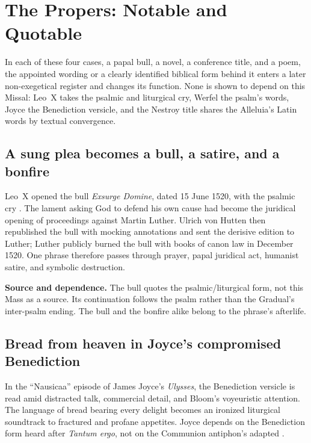 \sectionguard
\section*{The Propers: Notable and Quotable}

\begin{studyframe}
In each of these four cases, a papal bull, a novel, a conference title, and
a poem, the appointed wording or a clearly identified biblical form behind it
enters a later non-exegetical register and changes its function. None is shown
to depend on this Missal: Leo~X takes the psalmic and liturgical cry, Werfel
the psalm's words, Joyce the Benediction versicle, and the Nestroy title
shares the Alleluia's Latin words by textual convergence.
\end{studyframe}

\subsection*{A sung plea becomes a bull, a satire, and a bonfire\enspace{}}

Leo~X opened the bull \emph{Exsurge Domine}, dated 15 June 1520, with the
psalmic cry . The lament asking
God to defend his own cause had become the juridical opening of proceedings
against Martin Luther. Ulrich von Hutten then republished the bull with mocking
annotations and sent the derisive edition to Luther; Luther publicly burned
the bull with books of canon law in December 1520. One phrase therefore passes
through prayer, papal juridical act, humanist satire, and symbolic destruction.

\textbf{Source and dependence.} The bull quotes the psalmic/liturgical form, not this Mass as
a source. Its continuation follows the psalm rather than the Gradual's
inter-psalm ending. The bull and the bonfire alike belong to the phrase's
afterlife.

\subsection*{Bread from heaven in Joyce's compromised Benediction\enspace{}}

In the ``Nausicaa'' episode of James Joyce's \emph{Ulysses}, the Benediction
versicle  is read amid distracted talk,
commercial detail, and Bloom's voyeuristic attention. The language of bread
bearing every delight becomes an ironized liturgical soundtrack to fractured
and profane appetites. Joyce depends on the Benediction form heard after
\emph{Tantum ergo}, not on the Communion antiphon's adapted
.

